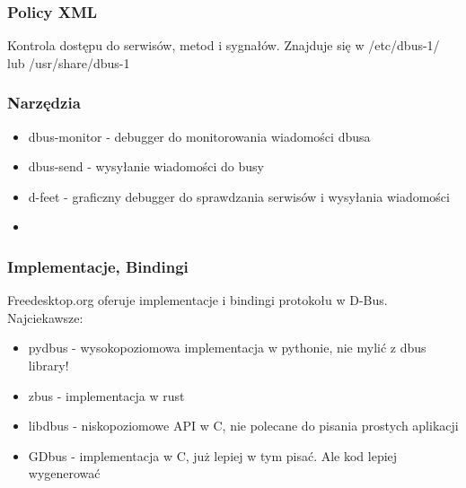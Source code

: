 \begin{frame}
    \frametitle{Policy XML}
    Kontrola dostępu do serwisów, metod i sygnałów.
    Znajduje się w /etc/dbus-1/ lub /usr/share/dbus-1
\end{frame}



\begin{frame}
    \frametitle{Narzędzia}
    \begin{itemize}
        \item dbus-monitor - debugger do monitorowania wiadomości dbusa
        \item dbus-send - wysyłanie wiadomości do busy
        \item d-feet - graficzny debugger do sprawdzania
        serwisów i wysyłania wiadomości
        \item 
    \end{itemize}
\end{frame}

\begin{frame}
    \frametitle{Implementacje, Bindingi}
    Freedesktop.org oferuje implementacje i bindingi protokołu w D-Bus. Najciekawsze:
    \begin{itemize}
        \item pydbus - wysokopoziomowa implementacja w pythonie, nie mylić z dbus library!
        \item zbus - implementacja w rust
        \item libdbus - niskopoziomowe API w C, nie polecane do pisania 
        prostych aplikacji
        \item GDbus - implementacja w C, już lepiej w tym pisać.
        Ale kod lepiej wygenerować
    \end{itemize}
\end{frame}